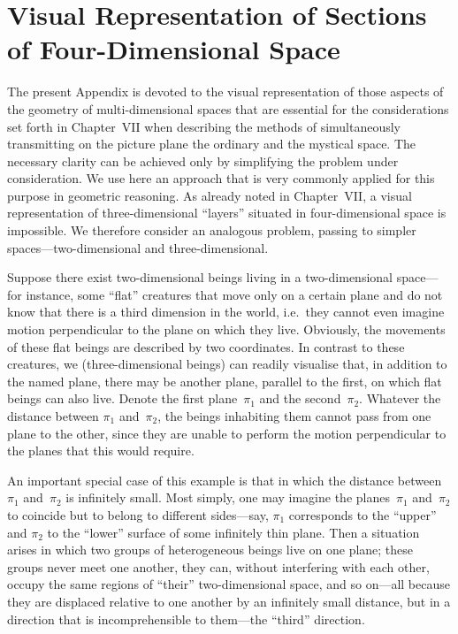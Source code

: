 
\chapter{Visual Representation of Sections of Four-Dimensional Space}


The present Appendix is devoted to the visual representation of those aspects of the
geometry of multi-dimensional spaces that are essential for the considerations set forth
in Chapter~VII when describing the methods of simultaneously transmitting on the picture
plane the ordinary and the mystical space.  The necessary clarity can be achieved only
by simplifying the problem under consideration.  We use here an approach that is very
commonly applied for this purpose in geometric reasoning.  As already noted in
Chapter~VII, a visual representation of three-dimensional ``layers'' situated in
four-dimensional space is impossible.  We therefore consider an analogous problem,
passing to simpler spaces---two-dimensional and three-dimensional.

Suppose there exist two-dimensional beings living in a two-dimensional space---for
instance, some ``flat'' creatures that move only on a certain plane and do not know
that there is a third dimension in the world, i.e.\ they cannot even imagine motion
perpendicular to the plane on which they live.  Obviously, the movements of these flat
beings are described by two coordinates.  In contrast to these creatures, we
(three-dimensional beings) can readily visualise that, in addition to the named plane,
there may be another plane, parallel to the first, on which flat beings can also live.
Denote the first plane~$\pi_1$ and the second~$\pi_2$.  Whatever the distance between
$\pi_1$ and~$\pi_2$, the beings inhabiting them cannot pass from one plane to the
other, since they are unable to perform the motion perpendicular to the planes that
this would require.

An important special case of this example is that in which the distance between~$\pi_1$
and~$\pi_2$ is infinitely small.  Most simply, one may imagine the planes~$\pi_1$
and~$\pi_2$ to coincide but to belong to different sides---say, $\pi_1$ corresponds to
the ``upper'' and $\pi_2$ to the ``lower'' surface of some infinitely thin plane.  Then
a situation arises in which two groups of heterogeneous beings live on one plane; these
groups never meet one another, they can, without interfering with each other, occupy the
same regions of ``their'' two-dimensional space, and so on---all because they are
displaced relative to one another by an infinitely small distance, but in a direction
that is incomprehensible to them---the ``third'' direction.

